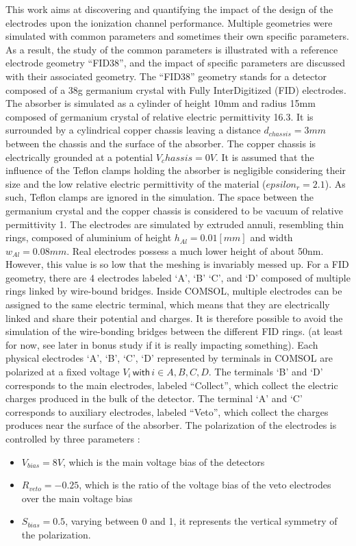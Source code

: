 This work aims at discovering and quantifying the impact of the design of the electrodes upon the ionization channel performance. Multiple geometries were simulated with common parameters and sometimes their own specific parameters. As a result, the study of the common parameters is illustrated with a reference electrode geometry “FID38”, and the impact of specific parameters are discussed with their associated geometry.
The “FID38” geometry stands for a detector composed of a 38g germanium crystal with Fully InterDigitized (FID) electrodes. The absorber is simulated as a cylinder of height 10mm and radius 15mm composed of germanium crystal of relative electric permittivity 16.3. It is surrounded by a cylindrical copper chassis leaving a distance $d_{chassis}=3mm$ between the chassis and the surface of the absorber. The copper chassis is electrically grounded at a potential $V_chassis=0V$. It is assumed that the influence of the Teflon clamps holding the absorber is negligible considering their size and the low relative electric permittivity of the material ($epsilon_r=2.1$). As such, Teflon clamps are ignored in the simulation. The space between the germanium crystal and the copper chassis is considered to be vacuum of relative permittivity 1. The electrodes are simulated by extruded annuli, resembling thin rings, composed of aluminium of height $h_{Al}=0.01[mm]$ and width $w_{Al}=0.08mm$. Real electrodes possess a much lower height of about 50nm. However, this value is so low that the meshing is invariably messed up. For a FID geometry, there are 4 electrodes labeled ‘A’, ‘B’ ‘C’, and ‘D’ composed of multiple rings linked by wire-bound bridges. Inside COMSOL, multiple electrodes can be assigned to the same electric terminal, which means that they are electrically linked and share their potential and charges. It is therefore possible to avoid the simulation of the wire-bonding bridges between the different FID rings. (at least for now, see later in bonus study if it is really impacting something). Each physical electrodes ‘A’, ‘B’, ‘C’, ‘D’ represented by terminals in COMSOL are polarized at a fixed voltage $V_i \, \textsf{with} \, i \in {A,B,C,D}$. The terminals ‘B’ and ‘D’ corresponds to the main electrodes, labeled “Collect”, which collect the electric charges produced in the bulk of the detector. The terminal ‘A’ and ‘C’ corresponds to auxiliary electrodes, labeled “Veto”, which collect the charges produces near the surface of the absorber. The polarization of the electrodes is controlled by three parameters :
\begin{itemize}
	\item $V_{bias}=8V$, which is the main voltage bias of the detectors
	\item $R_{veto}=-0.25$, which is the ratio of the voltage bias of the veto electrodes over the main voltage bias
	\item $S_{bias}=0.5$, varying between 0 and 1, it represents the vertical symmetry of the polarization.
\end{itemize}
